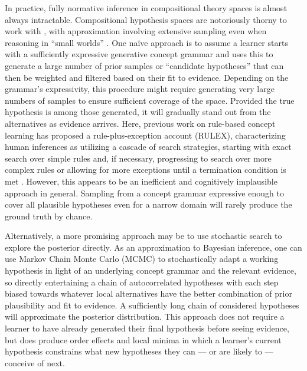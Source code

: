 \documentclass[doc,natbib,floatsintext]{apa7}
\begin{document}
In practice, fully normative inference in compositional theory spaces is almost always intractable. Compositional hypothesis spaces are notoriously thorny to work with \citep{ullman2012theory}, with approximation involving extensive sampling even when reasoning in ``small worlds'' \citep{savage1954foundations}. One na\"ive approach is to assume a learner starts with a sufficiently expressive generative concept grammar \citep{bramley2018grounding} and uses this to generate a large number of prior samples or ``candidate hypotheses'' that can then be weighted and filtered based on their fit to evidence. %
Depending on the grammar's expressivity, this procedure might require generating very large numbers of samples to ensure sufficient coverage of the space. Provided the true hypothesis is among those generated, it will gradually stand out from the alternatives as evidence arrives. Here, previous work on rule-based concept learning has proposed a rule-plus-exception account (RULEX), characterizing human inferences as utilizing a cascade of search strategies, starting with exact search over simple rules and, if necessary, progressing to search over more complex rules or allowing for more exceptions until a termination condition is met \citep{nosofsky1994rule}.  However, this appears to be an inefficient and cognitively implausible approach in general. Sampling from a concept grammar expressive enough to cover all plausible hypotheses even for a narrow domain will rarely produce the ground truth by chance.%

Alternatively, a more promising approach may be to use stochastic search to explore the posterior directly. As an approximation to Bayesian inference, one can use Markov Chain Monte Carlo (MCMC) to stochastically adapt a working hypothesis in light of an underlying concept grammar and the relevant evidence, so directly entertaining a chain of autocorrelated hypotheses with each step biased towards whatever local alternatives have the better combination of prior plausibility and fit to evidence. A sufficiently long chain of considered hypotheses will approximate the posterior distribution. This approach does not require a learner to have already generated their final hypothesis before seeing evidence, but does produce order effects and local minima in which a learner's current hypothesis constrains what new hypotheses they can --- or are likely to --- conceive of next.
\end{document}
